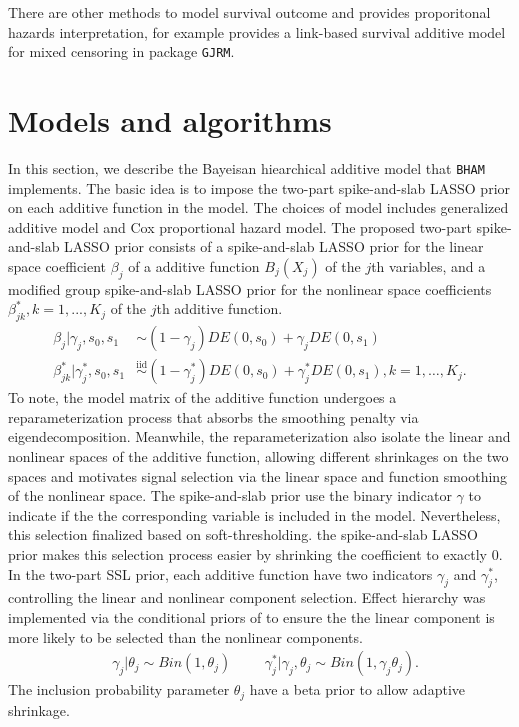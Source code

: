 \documentclass[
]{jss}
\begin{document}
There are other methods to model survival outcome and provides
proporitonal hazards interpretation, for example \cite{Marra2021}
provides a link-based survival additive model for mixed censoring in
package \texttt{GJRM}.

\section{Models and algorithms}

In this section, we describe the Bayeisan hiearchical additive model
that \texttt{BHAM} implements. The basic idea is to impose the two-part
spike-and-slab LASSO prior \cite{guo2022} on each additive function in
the model. The choices of model includes generalized additive model and
Cox proportional hazard model. The proposed two-part spike-and-slab
LASSO prior consists of a spike-and-slab LASSO prior for the linear
space coefficient \(\beta_j\) of a additive function \(B_j(X_j)\) of the
\(j\)th variables, and a modified group spike-and-slab LASSO prior for
the nonlinear space coefficients \(\beta_{jk}^*, k = 1,..., K_j\) of the
\(j\)th additive function. \begin{align}
  \beta_{j} | \gamma_{j},s_0,s_1 &\sim (1-\gamma_{j}) DE(0, s_0) + \gamma_{j} DE(0, s_1)\nonumber \\
  \beta^*_{jk} | \gamma^*_{j},s_0,s_1 &\overset{\text{iid}}{\sim}(1-\gamma_{j}^*) DE(0, s_0) + \gamma_{j}^*DE(0, s_1), k=1,\dots, K_j.
\end{align} To note, the model matrix of the additive function undergoes
a reparameterization process that absorbs the smoothing penalty via
eigendecomposition. Meanwhile, the reparameterization also isolate the
linear and nonlinear spaces of the additive function, allowing different
shrinkages on the two spaces and motivates signal selection via the
linear space and function smoothing of the nonlinear space. The
spike-and-slab prior use the binary indicator \(\gamma\) to indicate if
the the corresponding variable is included in the model. Nevertheless,
this selection finalized based on soft-thresholding. the spike-and-slab
LASSO prior makes this selection process easier by shrinking the
coefficient to exactly 0. In the two-part SSL prior, each additive
function have two indicators \(\gamma_{j}\) and \(\gamma^*_{j}\),
controlling the linear and nonlinear component selection. Effect
hierarchy was implemented via the conditional priors of to ensure the
the linear component is more likely to be selected than the nonlinear
components. \begin{align}
&\gamma_{j} | \theta_j \sim Bin(1, \theta_j) & & 
&\gamma_{j}^*| \gamma_{j}, \theta_j \sim Bin(1, \gamma_{j}\theta_j).
\end{align} The inclusion probability parameter \(\theta_j\) have a beta
prior to allow adaptive shrinkage.
\end{document}
